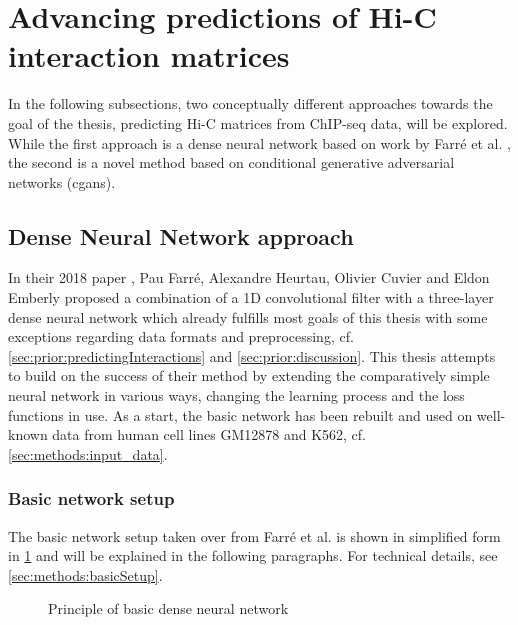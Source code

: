 \section{Advancing predictions of Hi-C interaction matrices}
In the following subsections, two conceptually different approaches towards the goal of the thesis,
predicting Hi-C matrices from ChIP-seq data, will be explored.
While the first approach is a dense neural network based on work by Farr\'e et al. \cite{Farre2018a},
the second is a novel method based on conditional generative adversarial networks (\acrshort{cgan}s).

\subsection{Dense Neural Network approach}\label{sec:improve:DNNapproach}
In their 2018 paper \cite{Farre2018a}, Pau Farr\'e, Alexandre Heurtau, Olivier Cuvier and Eldon Emberly
proposed a combination of a 1D convolutional filter with a three-layer dense neural network 
which already fulfills most goals of this thesis with some exceptions regarding data formats and preprocessing, 
cf. \cref{sec:prior:predictingInteractions} and \ref{sec:prior:discussion}.
This thesis attempts to build on the success of their method by extending the comparatively simple neural network
in various ways, changing the learning process and the loss functions in use.
As a start, the basic network has been rebuilt and used on well-known data from human cell lines GM12878 and K562, cf. \cref{sec:methods:input_data}.

\subsubsection{Basic network setup} \label{sec:improve:basicNetwork}
The basic network setup taken over from Farr\'e et al. \cite{Farre2018a} is shown in simplified form in \cref{fig:improve:priciple_basic_dnn}
and will be explained in the following paragraphs. For technical details, see \cref{sec:methods:basicSetup}.
\begin{figure}[hbp]
    \small
    \centering
    \caption{Principle of basic dense neural network}
    \label{fig:improve:priciple_basic_dnn}
\end{figure}


